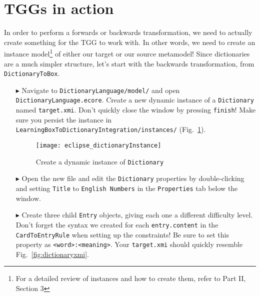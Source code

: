 \newpage
\section{TGGs in action}
\genHeader
\label{sect:TGGs_in_Action}

In order to perform a forwards or backwards transformation, we need to actually create something for the TGG to work with. In other words, we need to create an
instance model\footnote{For a detailed review of instances and how to create them, refer to Part II, Section 3} of either our target or our source metamodel!
Since dictionaries are a much simpler structure, let's start with the backwards transformation, from \texttt{DictionaryToBox}.

\begin{itemize}

\item[$\blacktriangleright$] Navigate to \texttt{Dictionary\-Language/model/} and open \texttt{Dictio\-nary\-Lang\-uage.ecore}. Create a new
dynamic instance of a \texttt{Dictionary} named \texttt{target.xmi}. Don't quickly close the window by pressing \texttt{finish}! Make sure you persist the
instance in \texttt{Learn\-ing\-Box\-To\-Dictionary\-In\-te\-gra\-tion/in\-stan\-ces/} (Fig.~\ref{fig:create_instance_dict}).

\begin{figure}[htbp]
\begin{center}
  \texttt{[image: eclipse\_dictionaryInstance]}
  \caption{Create a dynamic instance of \texttt{Dictionary}}
  \label{fig:create_instance_dict}
\end{center}
\end{figure}

\newpage

\item[$\blacktriangleright$] Open the new file and edit the \texttt{Dictionary} properties by double-clicking and setting \texttt{Title} to \texttt{English
Numbers} in the \texttt{Properties} tab below the window.

\vspace{0.5cm}

\item[$\blacktriangleright$] Create three child \texttt{Entry} objects, giving each one a different difficulty level. Don't forget the syntax we created for
each \texttt{entry.content} in the \texttt{CardToEntryRule} when setting up the constraints! Be sure to set this property as \texttt{<word>:<meaning>}. Your
\texttt{target.xmi} should quickly resemble Fig.~\ref{fig:dictionaryxmi}.


\end{itemize}
